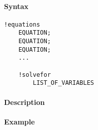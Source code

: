 


	\paragraph{Syntax}

\begin{verbatim}
!equations
    EQUATION;
    EQUATION;
    EQUATION;
    ...

    !solvefor
        LIST_OF_VARIABLES
\end{verbatim}

\paragraph{Description}

\paragraph{Example}


